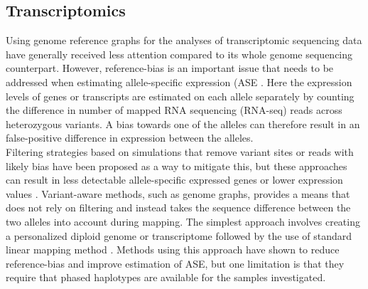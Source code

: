 \subsection{Transcriptomics}

Using genome reference graphs for the analyses of transcriptomic sequencing data have generally received less attention compared to its whole genome sequencing counterpart.
However, reference-bias is an important issue that needs to be addressed when estimating allele-specific expression (ASE \cite{Degner2009-vw,Castel2015-ef}.
Here the expression levels of genes or transcripts are estimated on each allele separately by counting the difference in number of mapped RNA sequencing (RNA-seq) reads across heterozygous variants.
A bias towards one of the alleles can therefore result in an false-positive difference in expression between the alleles. \\

Filtering strategies based on simulations that remove variant sites or reads with likely bias have been proposed as a way to mitigate this, but these approaches can result in less detectable allele-specific expressed genes or lower expression values \cite{Castel2015-ef,Van_de_Geijn2015-dz}. 
Variant-aware methods, such as genome graphs, provides a means that does not rely on filtering and instead takes the sequence difference between the two alleles into account during mapping.
The simplest approach involves creating a personalized diploid genome or transcriptome followed by the use of standard linear mapping method \cite{Turro2011-op,Rozowsky_2011,Bray_2016,Raghupathy2018-sd}.
Methods using this approach have shown to reduce reference-bias and improve estimation of ASE, but one limitation is that they require that phased haplotypes are available for the samples investigated.

